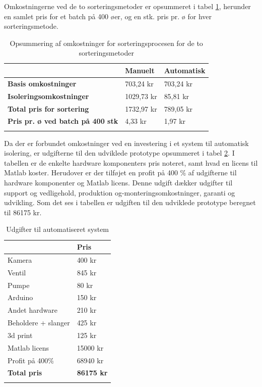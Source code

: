 Omkostningerne ved de to sorteringsmetoder er opsummeret i tabel \ref{tab:totalcost}, herunder en samlet pris for et batch på 400 øer, og en stk. pris pr. ø for hver sorteringsmetode.
\begin{center}
		\begin{longtable}{ | m{8cm} | m{2.25cm} | m{2.25cm} | } 
			\hline
			 &\textbf{Manuelt} & \textbf{Automatisk} \\ 
			\hline
			 \textbf{Basis omkostninger} & 703,24 kr & 703,24 kr \\ 
			\hline
			 \textbf{Isoleringsomkostninger} & 1029,73 kr & 85,81 kr \\ 
			\hline
			\textbf{Total pris for sortering} & 1732,97 kr & 789,05 kr \\ 
			\hline
			\textbf{Pris pr. ø ved batch på 400 stk} & 4,33 kr & 1,97 kr \\ 
			\hline
			\caption{Opsummering af omkostninger for sorteringsprocesen for de to sorteringsmetoder}
			\label{tab:totalcost}
			 		\end{longtable}
\end{center}

Da der er forbundet omkostninger ved en investering i et system til automatisk isolering, er udgifterne til den udviklede prototype opsummeret i tabel \ref{tab:prototypecost}. I tabellen er de enkelte hardware komponenters pris noteret, samt hvad en licens til Matlab koster. Herudover er der tilføjet en profit på 400 \% af udgifterne til hardware komponenter og Matlab licens. Denne udgift dækker udgifter til support og vedligehold, produktion og-monteringsomkostninger, garanti og udvikling. Som det ses i tabellen er udgiften til den udviklede prototype beregnet til 86175 kr.
\begin{center}
		\begin{longtable}{ | m{9.5cm} | m{3.5cm} | } 
			\hline
			  & \textbf{Pris} \\ 
			\hline
			Kamera & 400 kr \\ 
			\hline
			 Ventil & 845 kr\\ 
			\hline
			Pumpe & 80 kr  \\ 
			\hline
			Arduino & 150 kr \\ 
			\hline
			Andet hardware & 210 kr \\ 
			\hline
			Beholdere + slanger & 425 kr \\ 
			\hline
			3d print & 125 kr \\ 
			\hline
			Matlab licens & 15000 kr \\
			\hline
			Profit på 400\% & 68940 kr \\	
			\hline
			\textbf{Total pris} & \textbf{86175 kr} \\		
			
			\hline
			\caption{Udgifter til automatiseret system}
			\label{tab:prototypecost}
			 		\end{longtable}
\end{center}


